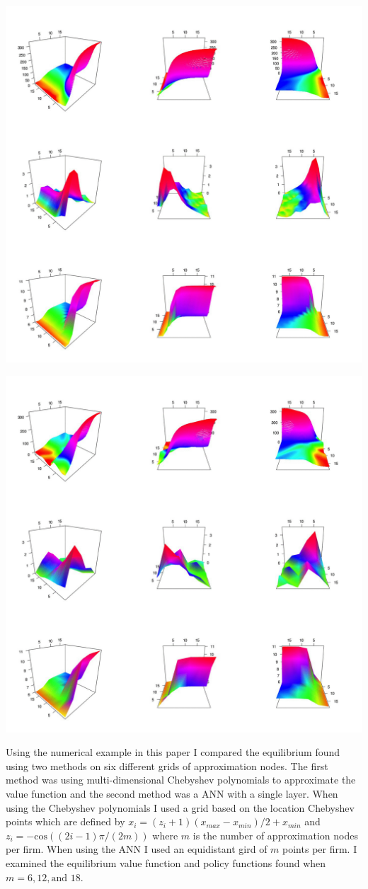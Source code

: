 \documentclass[12pt]{article}
\begin{document}
\includegraphics{plot_ann_12_eqm}

\includegraphics{plot_ann_6_eqm}


Using the numerical example in this paper I compared the equilibrium found using two methods on six different grids of approximation nodes. The first method was using multi-dimensional Chebyshev polynomials to approximate the value function and the second method was a ANN with a single layer. When using the Chebyshev polynomials I used a grid based on the location Chebyshev points which are defined by $x_i=(z_i+1)(x_{max}-x_{min})/2+x_{min}$ and $z_i=-\text{cos}((2i-1)\pi/(2m))$ where $m$ is the number of approximation nodes per firm. When using the ANN I used an equidistant gird of $m$ points per firm. I examined the equilibrium value function and policy functions found when $m=6,12,\text{and }18$.
\end{document}
